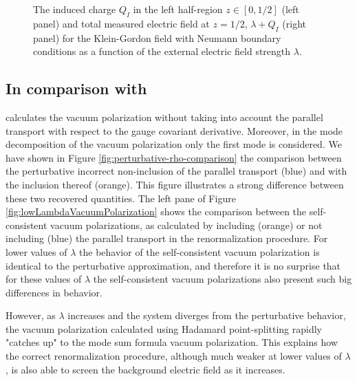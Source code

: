 \begin{figure}
\begin{subfigure}{0.5\textwidth}
 \end{subfigure}
\caption{The induced charge $Q_I$ in the left half-region $z\in [0, 1/2]$ (left panel) and total measured electric field at $z=1/2$, $\lambda + Q_I$ (right panel) for the Klein-Gordon field with Neumann boundary conditions as a function of the external electric field strength $\lambda$.}
    \label{fig:inducedChargeNeumann}
\end{figure}

\subsection{In comparison with \cite{Ambj1983}}

\cite{Ambj1983} calculates the vacuum polarization without taking into account the parallel transport with respect to the gauge covariant derivative. Moreover, in the mode decomposition of the vacuum polarization only the first mode is considered. We have shown in Figure \ref{fig:perturbative-rho-comparison} the comparison between the perturbative incorrect non-inclusion of the parallel transport (blue) and with the inclusion thereof (orange). This figure illustrates a strong difference between these two recovered quantities. The left pane of Figure \ref{fig:lowLambdaVacuumPolarization} shows the comparison between the self-consistent vacuum polarizations, as calculated by including (orange) or not including (blue) the parallel transport in the renormalization procedure. For lower values of $\lambda$ the behavior of the self-consistent vacuum polarization is identical to the perturbative approximation, and therefore it is no surprise that for these values of $\lambda$ the self-consistent vacuum polarizations also present such big differences in behavior. 

However, as $\lambda$ increases and the system diverges from the perturbative behavior, the vacuum polarization calculated using Hadamard point-splitting rapidly "catches up" to the mode sum formula vacuum polarization. This explains how the correct renormalization procedure, although much weaker at lower values of $\lambda$, is also able to screen the background electric field as it increases.

